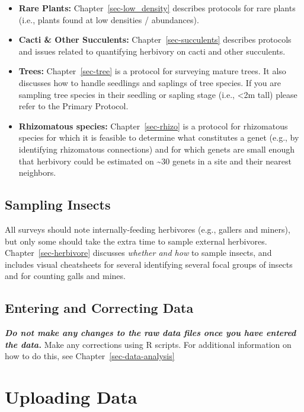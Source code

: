 \documentclass[
  letterpaper,
  oneside,
  open=any]{scrbook}
\begin{document}
\begin{itemize}
\item
  \textbf{Rare Plants:} Chapter~\ref{sec-low_density} describes
  protocols for rare plants (i.e., plants found at low densities /
  abundances).
\item
  \textbf{Cacti \& Other Succulents:} Chapter~\ref{sec-succulents}
  describes protocols and issues related to quantifying herbivory on
  cacti and other succulents.
\item
  \textbf{Trees:} Chapter~\ref{sec-tree} is a protocol for surveying
  mature trees. It also discusses how to handle seedlings and saplings
  of tree species. If you are sampling tree species in their seedling or
  sapling stage (i.e., \textless2m tall) please refer to the Primary
  Protocol.
\item
  \textbf{Rhizomatous species:} Chapter~\ref{sec-rhizo} is a protocol
  for rhizomatous species for which it is feasible to determine what
  constitutes a genet (e.g., by identifying rhizomatous connections) and
  for which genets are small enough that herbivory could be estimated on
  \textasciitilde30 genets in a site and their nearest neighbors.
\end{itemize}

\section{Sampling Insects}\label{sampling-insects}

All surveys should note internally-feeding herbivores (e.g., gallers and
miners), but only some should take the extra time to sample external
herbivores. Chapter~\ref{sec-herbivore} discusses \emph{whether and how}
to sample insects, and includes visual cheatsheets for several
identifying several focal groups of insects and for counting galls and
mines.

\section{Entering and Correcting
Data}\label{entering-and-correcting-data}

\textbf{\emph{Do not make any changes to the raw data files once you
have entered the data.}} Make any corrections using R scripts. For
additional information on how to do this, see
Chapter~\ref{sec-data-analysis}

\chapter{Uploading Data}\label{sec-uploading_data}
\end{document}
